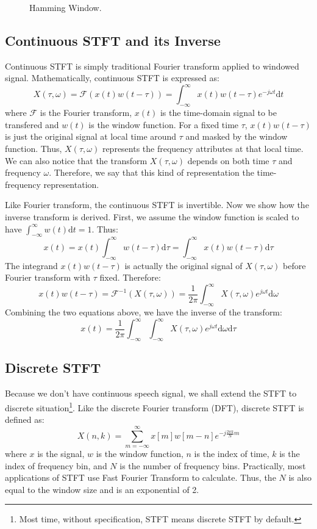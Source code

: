 \documentclass[11pt,a4paper]{report}
\begin{document}
\begin{figure}[htbp]
  \centering
  
  \caption[Hamming Window]{Hamming Window.}
  \label{fig:hamming}
\end{figure}

\subsection{Continuous STFT and its Inverse}
Continuous STFT is simply traditional Fourier transform applied to windowed signal. Mathematically, continuous STFT is expressed as:
\[ X(\tau, \omega) = \mathcal{F}(x(t)w(t-\tau)) =  \int_{-\infty}^{\infty} x(t)w(t-\tau)e^{-j\omega t}\mathrm{d}t \]
where $\mathcal{F}$ is the Fourier transform, $x(t)$ is the time-domain signal to be transfered and $w(t)$ is the window function. For a fixed time $\tau$, $x(t)w(t-\tau)$ is just the original signal at local time around $\tau$ and masked by the window function. Thus, $X(\tau, \omega)$ represents the frequency attributes at that local time. We can also notice that the transform $X(\tau, \omega)$ depends on both time $\tau$ and frequency $\omega$. Therefore, we say that this kind of representation the time-frequency representation.

Like Fourier transform, the continuous STFT is invertible. Now we show how the inverse transform is derived. First, we assume the window function is scaled to have $\int_{-\infty}^{\infty} w(t) \mathrm{d}t = 1$. Thus:
\[
  x(t) = x(t) \int_{-\infty}^{\infty} w(t-\tau) \mathrm{d}\tau = \int_{-\infty}^{\infty} x(t)w(t-\tau) \mathrm{d}\tau
\]
The integrand $x(t)w(t-\tau)$ is actually the original signal of $X(\tau, \omega)$ before Fourier transform with $\tau$ fixed. Therefore:
\[ x(t)w(t-\tau) = \mathcal{F}^{-1}(X(\tau, \omega)) = \frac{1}{2\pi} \int_{-\infty}^{\infty} X(\tau, \omega) e^{j\omega t} \mathrm{d}\omega \]
Combining the two equations above, we have the inverse of the transform:
\[ x(t) = \frac{1}{2\pi} \int_{-\infty}^{\infty} \int_{-\infty}^{\infty} X(\tau, \omega) e^{j\omega t} \mathrm{d}\omega \mathrm{d}\tau \]

\subsection{Discrete STFT}
Because we don't have continuous speech signal, we shall extend the STFT to discrete situation\footnote{Most time, without specification, STFT means discrete STFT by default.}. Like the discrete Fourier transform (DFT), discrete STFT is defined as:
\[ X(n, k) = \sum_{m = -\infty}^{\infty} x[m]w[m-n]e^{-j \frac{2\pi k}{N} m} \]
where $x$ is the signal, $w$ is the window function, $n$ is the index of time, $k$ is the index of frequency bin, and $N$ is the number of frequency bins. Practically, most applications of STFT use Fast Fourier Transform to calculate. Thus, the $N$ is also equal to the window size and is an exponential of 2.
\end{document}
